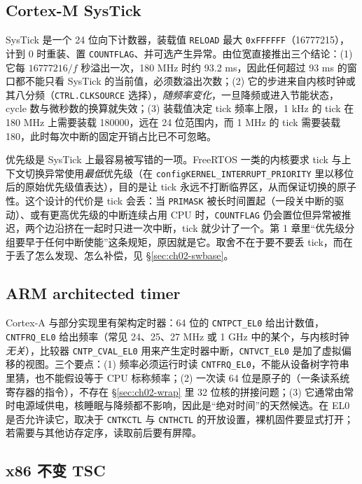 \documentclass[12pt,a4paper,fontset=fandol]{ctexbook}
\newcommand{\Tp}[1]{\texttt{#1}}
\begin{document}
\subsection{Cortex-M SysTick}

SysTick 是一个 24 位向下计数器，装载值 \Tp{RELOAD} 最大 \Tp{0xFFFFFF}（16777215），计到 0 时重装、置 \Tp{COUNTFLAG}、并可选产生异常。由位宽直接推出三个结论：(1) 它每 $16777216 / f$ 秒溢出一次，180 MHz 时约 93.2 ms，因此任何超过 93 ms 的窗口都不能只看 SysTick 的当前值，必须数溢出次数；(2) 它的步进来自内核时钟或其八分频（\Tp{CTRL.CLKSOURCE} 选择），\emph{随频率变化}，一旦降频或进入节能状态，cycle 数与微秒数的换算就失效；(3) 装载值决定 tick 频率上限，1 kHz 的 tick 在 180 MHz 上需要装载 180000，远在 24 位范围内，而 1 MHz 的 tick 需要装载 180，此时每次中断的固定开销占比已不可忽略。

优先级是 SysTick 上最容易被写错的一项。FreeRTOS 一类的内核要求 tick 与上下文切换异常使用\emph{最低}优先级（在 \Tp{configKERNEL\_INTERRUPT\_PRIORITY} 里以移位后的原始优先级值表达），目的是让 tick 永远不打断临界区，从而保证切换的原子性。这个设计的代价是 tick 会丢：当 \Tp{PRIMASK} 被长时间置起（一段关中断的驱动）、或有更高优先级的中断连续占用 CPU 时，\Tp{COUNTFLAG} 仍会置位但异常被推迟，两个边沿挤在一起时只进一次中断，tick 就少计了一个。第 1 章里``优先级分组要早于任何中断使能''这条规矩，原因就是它。取舍不在于要不要丢 tick，而在于丢了怎么发现、怎么补偿，见 \S\ref{sec:ch02-swbase}。

\subsection{ARM architected timer}

Cortex-A 与部分实现里有架构定时器：64 位的 \Tp{CNTPCT\_EL0} 给出计数值，\Tp{CNTFRQ\_EL0} 给出频率（常见 24、25、27 MHz 或 1 GHz 中的某个，与内核时钟\emph{无关}），比较器 \Tp{CNTP\_CVAL\_EL0} 用来产生定时器中断，\Tp{CNTVCT\_EL0} 是加了虚拟偏移的视图。三个要点：(1) 频率必须运行时读 \Tp{CNTFRQ\_EL0}，不能从设备树字符串里猜，也不能假设等于 CPU 标称频率；(2) 一次读 64 位是原子的（一条读系统寄存器的指令），不存在 \S\ref{sec:ch02-wrap} 里 32 位核的拼接问题；(3) 它通常由常时电源域供电，核睡眠与降频都不影响，因此是``绝对时间''的天然候选。在 EL0 是否允许读它，取决于 \Tp{CNTKCTL} 与 \Tp{CNTHCTL} 的开放设置，裸机固件要显式打开；若需要与其他访存定序，读取前后要有屏障。

\subsection{x86 不变 TSC}
\end{document}
